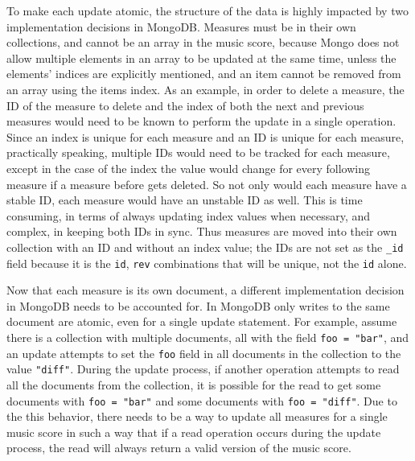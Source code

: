 \documentclass[letterpaper,12pt]{article}
\begin{document}
To make each update atomic, the structure of the data is highly impacted by two implementation decisions in MongoDB.
Measures must be in their own collections, and cannot be an array in the music score, because Mongo does not allow
multiple elements in an array to be updated at the same time, unless the elements' indices are explicitly mentioned, and
an item cannot be removed from an array using the items index. As an example, in order to delete a measure, the ID of
the measure to delete and the index of both the next and previous measures would need to be known to perform the update
in a single operation. Since an index is unique for each measure and an ID is unique for each measure, practically
speaking, multiple IDs would need to be tracked for each measure, except in the case of the index the value would change
for every following measure if a measure before gets deleted. So not only would each measure have a stable ID, each
measure would have an unstable ID as well. This is time consuming, in terms of always updating index values when
necessary, and complex, in keeping both IDs in sync. Thus measures are moved into their own collection with an ID and
without an index value; the IDs are not set as the \lstinline{_id} field because it is the \lstinline{id},
\lstinline{rev} combinations that will be unique, not the \lstinline{id} alone.

Now that each measure is its own document, a different implementation decision in MongoDB needs to be accounted for. In
MongoDB only writes to the same document are atomic, even for a single update statement. For example, assume there is a 
collection with multiple documents, all with the field \lstinline{foo = "bar"}, and an update attempts to set the
\lstinline{foo} field in all documents in the collection to the value \lstinline{"diff"}. During the update process, if
another operation attempts to read all the documents from the collection, it is possible for the read to get some 
documents with \lstinline{foo = "bar"} and some documents with \lstinline{foo = "diff"}. Due to the this behavior, there
needs to be a way to update all measures for a single music score in such a way that if a read operation occurs during
the update process, the read will always return a valid version of the music score.
\end{document}
